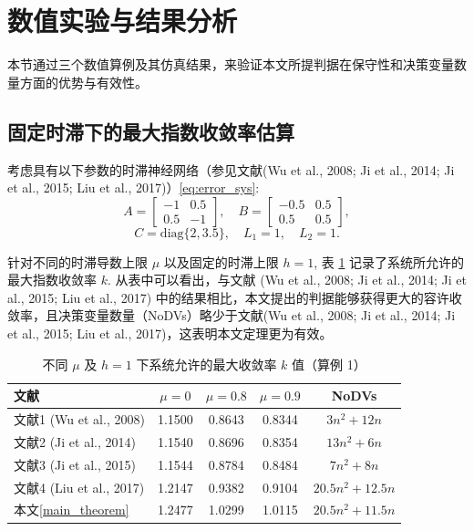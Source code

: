 \documentclass[a4paper, 12pt, oneside]{article}
\theoremstyle{cn_theorem}
\begin{document}
\section{数值实验与结果分析}

本节通过三个数值算例及其仿真结果，来验证本文所提判据在保守性和决策变量数量方面的优势与有效性。

\subsection{固定时滞下的最大指数收敛率估算}
考虑具有以下参数的时滞神经网络（参见文献(Wu et al., 2008; Ji et al., 2014; Ji et al., 2015; Liu et al., 2017)）\eqref{eq:error_sys}: 
\begin{equation*}
    A = \begin{bmatrix} -1 & 0.5 \\ 0.5 & -1 \end{bmatrix}, \quad B = \begin{bmatrix} -0.5 & 0.5 \\ 0.5 & 0.5 \end{bmatrix},
\end{equation*}
\begin{equation*}
    C = \mathrm{diag}\{2, 3.5\}, \quad L_1 = 1, \quad L_2 = 1.
\end{equation*}

针对不同的时滞导数上限 $\mu$ 以及固定的时滞上限 $h=1$, 表 \ref{tab:example1} 记录了系统所允许的最大指数收敛率 $k$. 从表中可以看出，与文献 (Wu et al., 2008; Ji et al., 2014; Ji et al., 2015; Liu et al., 2017) 中的结果相比，本文提出的判据能够获得更大的容许收敛率，且决策变量数量（NoDVs）略少于文献(Wu et al., 2008; Ji et al., 2014; Ji et al., 2015; Liu et al., 2017)，这表明本文定理更为有效。

\begin{table}[htbp]
    \centering
    \caption{不同 $\mu$ 及 $h=1$ 下系统允许的最大收敛率 $k$ 值（算例 1）}
    \label{tab:example1}
    \begin{tabular}{l c c c c}
        \toprule
        文献 & $\mu=0$ & $\mu=0.8$ & $\mu=0.9$ & NoDVs \\
        \midrule
        文献1 (Wu et al., 2008) & 1.1500 & 0.8643 & 0.8344 & $3n^2+12n$ \\
        文献2 (Ji et al., 2014) & 1.1540 & 0.8696 & 0.8354 & $13n^2+6n$ \\
        文献3 (Ji et al., 2015) & 1.1544 & 0.8784 & 0.8484 & $7n^2+8n$ \\
        文献4 (Liu et al., 2017) & 1.2147 & 0.9382 & 0.9104 & $20.5n^2+12.5n$ \\
        本文\cref{main_theorem}   & 1.2477 & 1.0299 & 1.0115 & $20.5n^2+11.5n$ \\
        \bottomrule
    \end{tabular}
\end{table}
\end{document}
